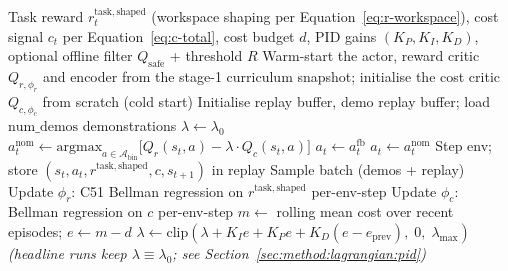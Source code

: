 \documentclass[11pt,a4paper]{report}
\begin{document}
\begin{algorithm}[htbp]
\caption{The value-based Lagrangian training loop (headline
dual-critic, mean-cost formulation). Because the backbone is
critic-only, the constraint enters through action selection on
$Q_r - \lambda Q_c$ rather than through an actor update: both
critics train on stationary Bellman targets, the cost critic is
backed up at per-env-step granularity, and $\lambda$ is fixed in the
headline configuration because PID auto-tuning is seed-unstable at
the feasibility boundary (Section~\ref{sec:results:budget}).}
\label{alg:constrained-rl}
\begin{algorithmic}[1]
\Require Task reward $r^{\mathrm{task,shaped}}_t$ (workspace shaping
  per Equation~\ref{eq:r-workspace}), cost signal $c_t$ per
  Equation~\ref{eq:c-total}, cost budget $d$, PID gains
  $(K_P, K_I, K_D)$, optional offline filter $Q_{\mathrm{safe}}$ +
  threshold $R$
\State Warm-start the actor, reward critic $Q_{r,\phi_r}$ and
  encoder from the stage-1 curriculum snapshot; initialise the cost
  critic $Q_{c,\phi_c}$ from scratch (cold start)
\State Initialise replay buffer, demo replay buffer; load
  $\text{num\_demos}$ demonstrations
\State $\lambda \leftarrow \lambda_0$ 
  \State $a^{\mathrm{nom}}_t \leftarrow \mathrm{argmax}_{a \in
  \mathcal{A}_{\mathrm{bin}}}\!\big[Q_r(s_t,a) - \lambda \cdot
  Q_c(s_t,a)\big]$
    \State $a_t \leftarrow a^{\mathrm{fb}}_t$ 
  \Else
    \State $a_t \leftarrow a^{\mathrm{nom}}_t$
  \EndIf
  \State Step env; store $(s_t, a_t, r^{\mathrm{task,shaped}}, c,
    s_{t+1})$ in replay
  \State Sample batch (demos + replay)
  \State Update $\phi_r$: C51 Bellman regression on
    $r^{\mathrm{task,shaped}}$ per-env-step
  \State Update $\phi_c$: Bellman regression on $c$ per-env-step
    \State $m \leftarrow$ rolling mean cost over recent episodes;
      \quad $e \leftarrow m - d$
    \State $\lambda \leftarrow \mathrm{clip}(\lambda + K_I e
      + K_P e + K_D (e - e_{\mathrm{prev}}),\; 0,\; \lambda_{\max})$
  \EndIf
  \Statex \hspace{\algorithmicindent}\textit{(headline runs keep
    $\lambda \equiv \lambda_0$; see
    Section~\ref{sec:method:lagrangian:pid})}
\EndFor
\end{algorithmic}
\end{algorithm}
\end{document}
